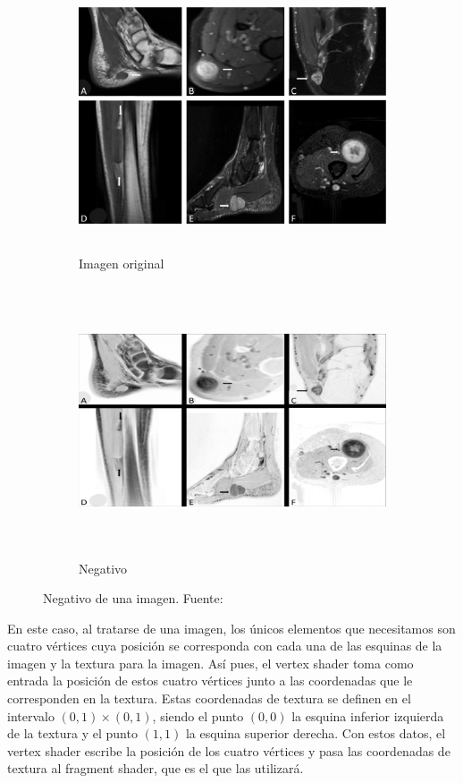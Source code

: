 \begin{figure}[ht]
	\centering	
	\begin{subfigure}{0.45\textwidth}
		\includegraphics[height=8cm,width=\textwidth]{figures/mynegative00.jpg}
		\caption{Imagen original}
	\end{subfigure}
	\hfill
	\begin{subfigure}{0.45\textwidth}
		\includegraphics[height=8cm,width=\textwidth]{figures/mynegative01.png}
		\caption{Negativo}
	\end{subfigure}
	\caption[Negativo de una imagen.]{Negativo de una imagen.
	Fuente:~\cite{negativeimage}}
	\label{fig:mynegative}
\end{figure}

En este caso, al tratarse de una imagen, los únicos elementos que necesitamos
son cuatro vértices cuya posición se corresponda con cada una de las esquinas de
la imagen y la textura para la imagen. Así pues, el vertex shader toma como
entrada la posición de estos cuatro vértices junto a las coordenadas que le
corresponden en la textura. Estas coordenadas de textura se definen en el
intervalo $(0,1)\times(0,1)$, siendo el punto $(0,0)$ la esquina inferior
izquierda de la textura y el punto $(1,1)$ la esquina superior derecha. Con
estos datos, el vertex shader escribe la posición de los cuatro vértices y pasa
las coordenadas de textura al fragment shader, que es el que las utilizará. 

